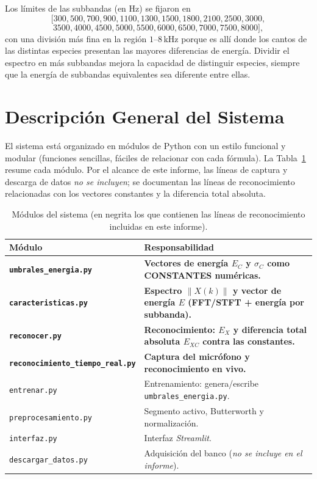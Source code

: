 \documentclass[conference]{IEEEtran}
\begin{document}
Los límites de las subbandas (en Hz) se fijaron en
\[
[300, 500, 700, 900, 1100, 1300, 1500, 1800, 2100, 2500, 3000,
\]\[
3500, 4000, 4500, 5000, 5500, 6000, 6500, 7000, 7500, 8000],
\]
con una división más fina en la región $1$--$8$\,kHz porque es allí donde los
cantos de las distintas especies presentan las mayores diferencias de energía.
Dividir el espectro en más subbandas mejora la capacidad de distinguir especies,
siempre que la energía de subbandas equivalentes sea diferente entre ellas.

\section{Descripción General del Sistema}\label{sec:sistema}
El sistema está organizado en módulos de Python con un estilo funcional y modular
(funciones sencillas, fáciles de relacionar con cada fórmula). La
Tabla~\ref{tab:modulos} resume cada módulo. Por el alcance de este informe, las
líneas de captura y descarga de datos \emph{no se incluyen}; se documentan las
líneas de reconocimiento relacionadas con los vectores constantes y la diferencia
total absoluta.

\begin{table}[!t]
\caption{Módulos del sistema (en negrita los que contienen las líneas de
reconocimiento incluidas en este informe).}
\label{tab:modulos}
\centering
\renewcommand{\arraystretch}{1.2}
\begin{tabularx}{\columnwidth}{@{}l X@{}}
\toprule
\textbf{Módulo} & \textbf{Responsabilidad} \\
\midrule
\textbf{\texttt{umbrales\_energia.py}} & \textbf{Vectores de energía $E_C$ y
$\sigma_C$ como CONSTANTES numéricas.} \\
\textbf{\texttt{caracteristicas.py}} & \textbf{Espectro $\lVert X(k)\rVert$ y
vector de energía $E$ (FFT/STFT + energía por subbanda).} \\
\textbf{\texttt{reconocer.py}} & \textbf{Reconocimiento: $E_X$ y diferencia total
absoluta $E_{XC}$ contra las constantes.} \\
\textbf{\texttt{reconocimiento\_tiempo\_real.py}} & \textbf{Captura del micrófono
y reconocimiento en vivo.} \\
\texttt{entrenar.py} & Entrenamiento: genera/escribe \texttt{umbrales\_energia.py}. \\
\texttt{preprocesamiento.py} & Segmento activo, Butterworth y normalización. \\
\texttt{interfaz.py} & Interfaz \textit{Streamlit}. \\
\texttt{descargar\_datos.py} & Adquisición del banco (\emph{no se incluye en el
informe}). \\
\bottomrule
\end{tabularx}
\end{table}
\end{document}
